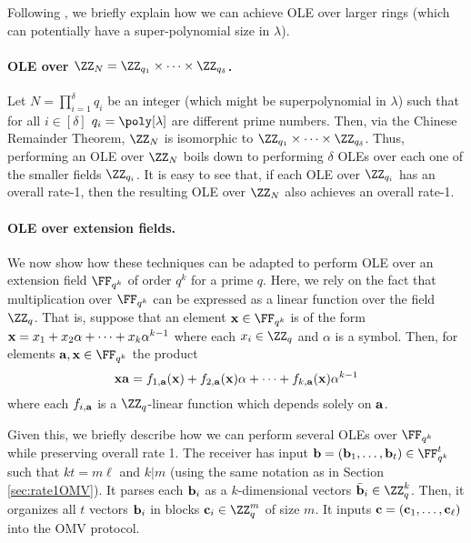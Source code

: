 Following \cite{C:DGIMMO19},  we briefly explain how we can achieve OLE over larger rings (which can potentially have a super-polynomial size in $\lambda$).

\paragraph{OLE over $\ZZ_N=\ZZ_{q_1}\times \dots \times \ZZ_{q_\delta}$.} Let $N=\prod_{i=1}^\delta q_i$ be an integer (which might be superpolynomial in $\lambda$) such that for all $i\in [\delta]$ $q_i=\poly[\lambda]$ are different prime numbers. Then, via the Chinese Remainder Theorem, $\ZZ_N$ is isomorphic to $\ZZ_{q_1}\times \dots \times \ZZ_{q_\delta}$. Thus, performing an OLE over $\ZZ_N$ boils down to performing $\delta$ OLEs over each one of the smaller fields $\ZZ_{q_i}$. It is easy to see that, if each OLE over $\ZZ_{q_i}$ has an overall rate-1, then the resulting OLE over $\ZZ_N$ also achieves an overall rate-1.

\paragraph{OLE over extension fields.} We now show how these techniques can be adapted to perform OLE over an extension field $\FF_{q^k}$ of order $q^k$ for a prime $q$. Here, we rely on the fact that multiplication over $\FF_{q^k}$ can be expressed as a linear function over the field $\ZZ_q$. That is, suppose that an element $\xn\in\FF_{q^k}$ is of the form $\mathbf{x}=x_1+x_2\alpha+\dots + x_{k}\alpha^{k-1}$ where each $x_i\in\ZZ_q$  and  $\alpha$ is a symbol. Then, for elements $\an,\xn\in\FF_{q^k}$ the product $$\mathbf{x}\mathbf{a}=f_{1,\mathbf{a}}(\mathbf{x})+f_{2,\mathbf{a}}(\mathbf{x})\alpha+\dots + f_{k,\mathbf{a}}(\mathbf{x})\alpha^{k-1}$$ where each $f_{i,\mathbf{a}}$ is a $\ZZ_q$-linear function which depends solely on $\mathbf{a}$.

Given this, we briefly describe how we can perform several OLEs over $\FF_{q^k}$ while preserving overall rate 1. The receiver has input $\bn=(\bn_1,\dots, \bn_t)\in\FF_{q^k}^t$ such that $kt=m\ell$ and $k|m$ (using the same notation as in Section \ref{sec:rate1OMV}). It parses each $\mathbf{b}_i$ as a $k$-dimensional vectors $\bar \bn_i\in\ZZ_q^k$. Then, it organizes all $t$ vectors $\mathbf{b}_i$ in blocks $\cn_i\in\ZZ_q^m$ of size $m$. It inputs $\mathbf{c}=(\mathbf{c}_1,\dots, \mathbf{c}_\ell)$ into the OMV protocol.


